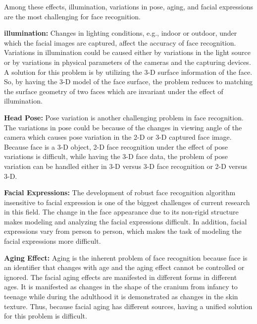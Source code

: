Among these effects, illumination, variations in pose, aging, and
facial expressions are the most challenging for face recognition.

\bi
\item \textbf{illumination:} Changes in lighting conditions, e.g.,
indoor or outdoor, under which the facial images are captured,
affect the accuracy of face recognition. Variations in illumination
could be caused either by variations in the light source or by
variations in physical parameters of the cameras and the capturing
devices. A solution for this problem is by utilizing the 3-D surface
information of the face. So, by having the 3-D model of the face
surface, the problem reduces to matching the surface geometry of two
faces which are invariant under the effect of illumination.

\item \textbf{Head Pose:} Pose variation is another challenging problem in face
recognition. The variations in pose could be because of the changes
in viewing angle of the camera which causes pose variation in the
2-D or 3-D captured face image. Because face is a 3-D object, 2-D
face recognition under the effect of pose variations is difficult,
while having the 3-D face data, the problem of pose variation can be
handled either in 3-D versus 3-D face recognition or 2-D versus 3-D.

\item\textbf{Facial Expressions:} The development of robust face recognition
algorithm insensitive to facial expression is one of the biggest
challenges of current research in this field. The change in the face
appearance due to its non-rigid structure makes modeling and
analyzing the facial expressions difficult. In addition, facial
expressions vary from person to person, which makes the task of
modeling the facial expressions more difficult.

\item\textbf{Aging Effect:} Aging is the inherent problem of face recognition
because face is an identifier that changes with age and the aging
effect cannot be controlled or ignored. The facial aging effects are
manifested in different forms in different ages. It is manifested as
changes in the shape of the cranium from infancy to teenage while
during the adulthood it is demonstrated as changes in the skin
texture. Thus, because facial aging has different sources, having a
unified solution for this problem is difficult. \ei

